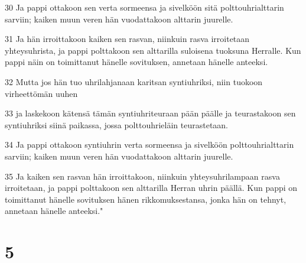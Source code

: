 \par 30 Ja pappi ottakoon sen verta sormeensa ja sivelköön sitä polttouhrialttarin sarviin; kaiken muun veren hän vuodattakoon alttarin juurelle.
\par 31 Ja hän irroittakoon kaiken sen rasvan, niinkuin rasva irroitetaan yhteysuhrista, ja pappi polttakoon sen alttarilla suloisena tuoksuna Herralle. Kun pappi näin on toimittanut hänelle sovituksen, annetaan hänelle anteeksi.
\par 32 Mutta jos hän tuo uhrilahjanaan karitsan syntiuhriksi, niin tuokoon virheettömän uuhen
\par 33 ja laskekoon kätensä tämän syntiuhriteuraan pään päälle ja teurastakoon sen syntiuhriksi siinä paikassa, jossa polttouhrieläin teurastetaan.
\par 34 Ja pappi ottakoon syntiuhrin verta sormeensa ja sivelköön polttouhrialttarin sarviin; kaiken muun veren hän vuodattakoon alttarin juurelle.
\par 35 Ja kaiken sen rasvan hän irroittakoon, niinkuin yhteysuhrilampaan rasva irroitetaan, ja pappi polttakoon sen alttarilla Herran uhrin päällä. Kun pappi on toimittanut hänelle sovituksen hänen rikkomuksestansa, jonka hän on tehnyt, annetaan hänelle anteeksi."

\chapter{5}

